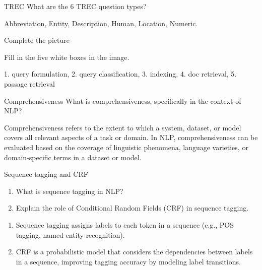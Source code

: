\documentclass{article}
\begin{document}
\begin{exercise}{TREC}\label{ex:trec}
  What are the 6 TREC question types?

  \begin{solution}
    Abbreviation, Entity, Description, Human, Location, Numeric.
  \end{solution}
\end{exercise}

\begin{exercise}{Complete the picture}
  

  Fill in the five white boxes in the image.

  \begin{solution}
    1. query formulation, 2. query classification, 3. indexing, 4. doc retrieval, 5. passage retrieval
  \end{solution}
\end{exercise}



\setcounter{section}{2020}

\begin{exercise}{Comprehensiveness}
  What is comprehensiveness, specifically in the context of NLP?

  \begin{solution}
    Comprehensiveness refers to the extent to which a system, dataset, or model covers all relevant aspects of a task or domain.
    In NLP, comprehensiveness can be evaluated based on the coverage of linguistic phenomena, language varieties, or domain-specific terms in a dataset or model.
  \end{solution}
\end{exercise}

\begin{exercise}{Sequence tagging and CRF}\label{ex:seq-tagging}
  \begin{enumerate}
    \item What is sequence tagging in NLP?
    \item Explain the role of Conditional Random Fields (CRF) in sequence tagging.
  \end{enumerate}

  \begin{solution}
    \begin{enumerate}
        \item Sequence tagging assigns labels to each token in a sequence (e.g., POS tagging, named entity recognition).
        \item CRF is a probabilistic model that considers the dependencies between labels in a sequence, improving tagging accuracy by modeling label transitions.
    \end{enumerate}
  \end{solution}
\end{exercise}
\end{document}

